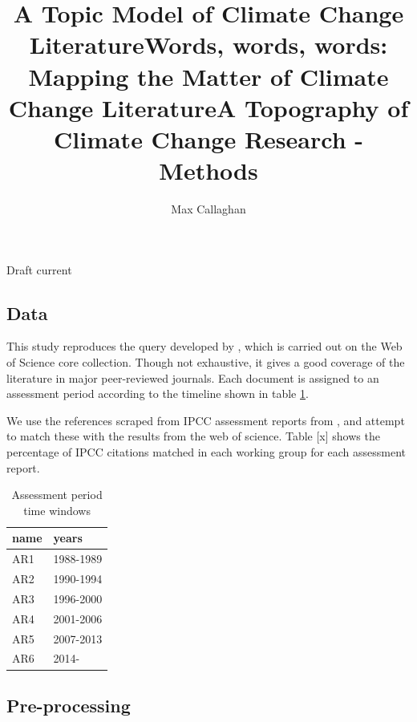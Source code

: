 \documentclass{article}
\makeatletter
\renewcommand{\maketitle}{\bgroup\setlength{\parindent}{0pt}
	\begin{flushleft}
		
		{\huge\textbf{\@title}}
		
		\bigskip
		
		{\large\textbf{\@author}}
		
		\bigskip
		
		{\large{Draft current \@date}}
		
	\end{flushleft}\egroup
}
\makeatother
\begin{document}
	\title{A Topic Model of Climate Change Literature}
	\title{Words, words, words: Mapping the Matter of Climate Change Literature}
	\title{A Topography of Climate Change Research - Methods}
	\author[1,2]{Max Callaghan}
	
	\maketitle
	\begin{linenumbers}
		
	\subsection*{Data}
	
	This study reproduces the query developed by \citep{Grieneisen2011}, which is carried out on the Web of Science core collection. Though not exhaustive, it gives a good coverage of the literature in major peer-reviewed journals.	Each document is assigned to an assessment period according to the timeline shown in table \ref{aryears}.
	
	We use the references scraped from IPCC assessment reports from \citep{Minx2017l}, and attempt to match these with the results from the web of science. Table [x] shows the percentage of IPCC citations matched in each working group for each assessment report.
	
	\begin{table}[htp]
		\begin{tabular}{ll}
			\toprule
			name &      years \\
			\midrule
			AR1 &  1988-1989 \\
			AR2 &  1990-1994 \\
			AR3 &  1996-2000 \\
			AR4 &  2001-2006 \\
			AR5 &  2007-2013 \\
			AR6 &      2014- \\
			\bottomrule
		\end{tabular}
		\caption{Assessment period time windows}
		\label{aryears}
	\end{table}
	
	\subsection*{Pre-processing}
	

\end{linenumbers}
\end{document}
